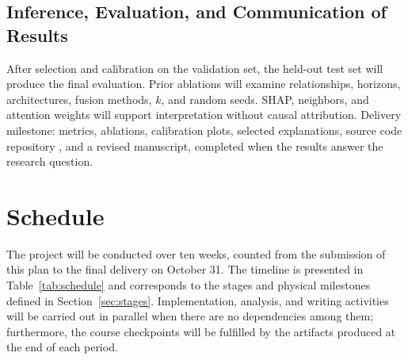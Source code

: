 \documentclass[conference]{IEEEtran}
\begin{document}
\subsection{Inference, Evaluation, and Communication of Results}

After selection and calibration on the validation set, the held-out test set will produce the final evaluation. Prior ablations will examine relationships, horizons, architectures, fusion methods, $k$, and random seeds. SHAP, neighbors, and attention weights will support interpretation without causal attribution. Delivery milestone: metrics, ablations, calibration plots, selected explanations, source code repository \cite{gnnriskcreditcarddefault2026}, and a revised manuscript, completed when the results answer the research question.

\section{Schedule}
\label{sec:schedule}

The project will be conducted over ten weeks, counted from the submission of this plan to the final delivery on October 31. The timeline is presented in Table~\ref{tab:schedule} and corresponds to the stages and physical milestones defined in Section~\ref{sec:stages}. Implementation, analysis, and writing activities will be carried out in parallel when there are no dependencies among them; furthermore, the course checkpoints will be fulfilled by the artifacts produced at the end of each period.
\end{document}
